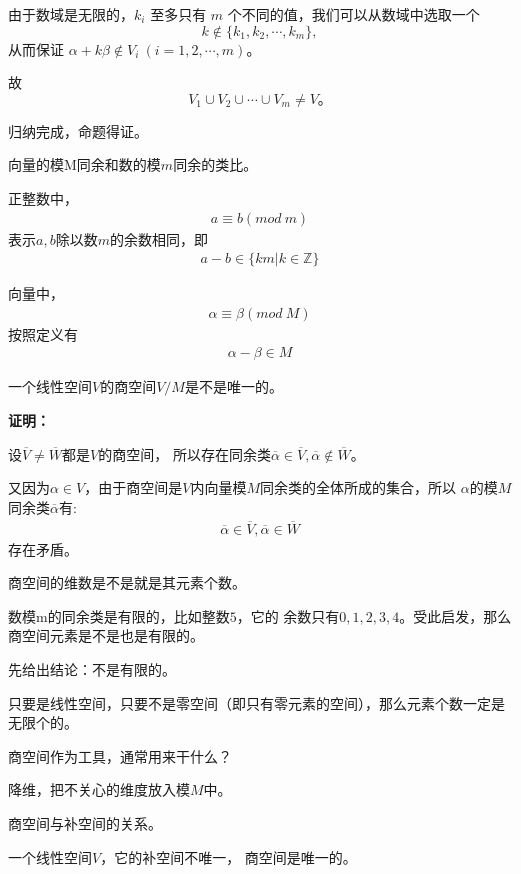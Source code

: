 \documentclass{article}
\begin{document}
由于数域是无限的，$k_i$ 至多只有 $m$ 个不同的值，我们可以从数域中选取一个
\[
  k \notin \{k_1, k_2, \cdots, k_m\},
\]
从而保证 $\alpha + k \beta \notin V_i \ (i=1,2,\cdots,m)$。

故
\[
  V_1 \cup V_2 \cup \cdots \cup V_m \neq V。
\]

归纳完成，命题得证。

\begin{zremark}
  向量的模M同余和数的模$m$同余的类比。
\end{zremark}

正整数中，
\begin{align*}
  a \equiv b (mod \ m)
\end{align*}
表示$a,b$除以数$m$的余数相同，即
\begin{align*}
  a - b \in \{km | k \in \mathbb{Z}\}
\end{align*}

向量中，
\begin{align*}
  \alpha \equiv \beta (mod \ M)
\end{align*}
按照定义有
\begin{align*}
  \alpha - \beta \in M
\end{align*}

\begin{zremark}
  一个线性空间$V$的商空间$V/M$是不是唯一的。
\end{zremark}

\textbf{证明：}

设$\overline{V} \neq \overline{W}$都是$V$的商空间，
所以存在同余类$\overline{\alpha} \in \overline{V}, \overline{\alpha} \notin \overline{W}$。

又因为$\alpha \in V$，由于商空间是$V$内向量模$M$同余类的全体所成的集合，所以
$\alpha$的模$M$同余类$\overline{\alpha}$有:
\begin{align*}
  \overline{\alpha} \in \overline{V}, \overline{\alpha} \in \overline{W}
\end{align*}
存在矛盾。

\begin{zremark}
  商空间的维数是不是就是其元素个数。
\end{zremark}

数模m的同余类是有限的，比如整数$5$，它的
余数只有$0, 1, 2, 3, 4$。受此启发，那么商空间元素是不是也是有限的。

先给出结论：不是有限的。

只要是线性空间，只要不是零空间（即只有零元素的空间），那么元素个数一定是无限个的。

\begin{zremark}
  商空间作为工具，通常用来干什么？
\end{zremark}

降维，把不关心的维度放入模$M$中。

\begin{zremark}
  商空间与补空间的关系。
\end{zremark}

一个线性空间$V$，它的补空间不唯一，
商空间是唯一的。
\end{document}
